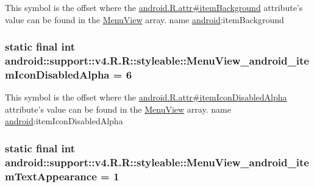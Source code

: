 This symbol is the offset where the \hyperlink{}{android.R.attr\#itemBackground} attribute's value can be found in the \hyperlink{classandroid_1_1support_1_1v4_1_1_r_1_1styleable_f27b70b4d764f1a1f59531c58e843a3b}{MenuView} array.  name \hyperlink{namespaceandroid}{android}:itemBackground \hypertarget{classandroid_1_1support_1_1v4_1_1_r_1_1styleable_020f8607a79d9f432c3dc7dda196136b}{
\subsubsection[{MenuView\_\-android\_\-itemIconDisabledAlpha}]{\setlength{\rightskip}{0pt plus 5cm}static final int android::support::v4.R.R::styleable::MenuView\_\-android\_\-itemIconDisabledAlpha = 6}}
\label{classandroid_1_1support_1_1v4_1_1_r_1_1styleable_020f8607a79d9f432c3dc7dda196136b}


This symbol is the offset where the \hyperlink{}{android.R.attr\#itemIconDisabledAlpha} attribute's value can be found in the \hyperlink{classandroid_1_1support_1_1v4_1_1_r_1_1styleable_f27b70b4d764f1a1f59531c58e843a3b}{MenuView} array.  name \hyperlink{namespaceandroid}{android}:itemIconDisabledAlpha \hypertarget{classandroid_1_1support_1_1v4_1_1_r_1_1styleable_f5aae86805e86421e406c3299856bfae}{
\subsubsection[{MenuView\_\-android\_\-itemTextAppearance}]{\setlength{\rightskip}{0pt plus 5cm}static final int android::support::v4.R.R::styleable::MenuView\_\-android\_\-itemTextAppearance = 1}}
\label{classandroid_1_1support_1_1v4_1_1_r_1_1styleable_f5aae86805e86421e406c3299856bfae}


